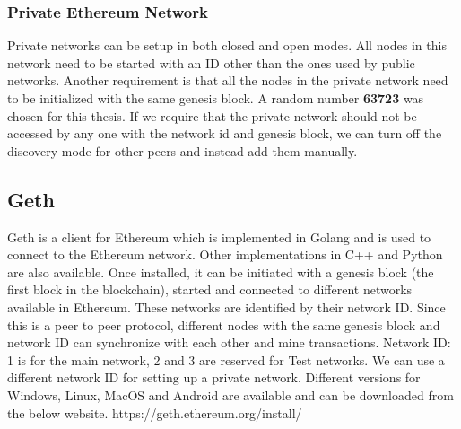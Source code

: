 \documentclass[11pt,openright]{report}
\begin{document}
\subsubsection{Private Ethereum Network}
Private networks can be setup in both closed and open modes. All nodes in this network need to be started with an ID other than the ones used by public networks. Another requirement is that all the nodes in the private network need to be initialized with the same genesis block. A random number \textbf{63723} was chosen for this thesis. If we require that the private network should not be accessed by any one with the network id and genesis block, we can turn off the discovery mode for other peers and instead add them manually.

\subsection{Geth}
Geth is a client for Ethereum which is implemented in Golang and is used to connect to the Ethereum network. Other implementations in C++ and Python are also available. Once installed, it can be initiated with a genesis block (the first block in the blockchain), started and connected to different networks available in Ethereum. These networks are identified by their network ID. Since this is a peer to peer protocol, different nodes with the same genesis block and network ID can synchronize with each other and mine transactions. Network ID: 1 is for the main network, 2 and 3 are reserved for Test networks. We can use a different network ID for setting up a private network. Different versions for Windows, Linux, MacOS and Android are available and can be downloaded from the below website.
https://geth.ethereum.org/install/
\end{document}
